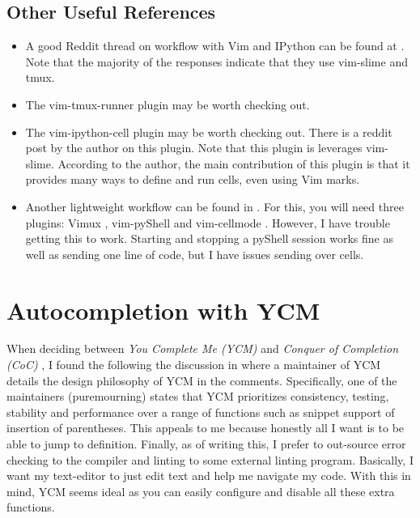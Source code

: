 \subsection{Other Useful References}
\begin{itemize}
    \item A good Reddit thread on workflow with Vim and IPython can be found at
        \cite{abdeljalil732020anyone}. Note that the majority of the responses
        indicate that they use vim-slime and tmux.
    \item The vim-tmux-runner plugin \cite{toomey2013tmuxrunner} may be worth checking out.
    \item The vim-ipython-cell plugin \cite{hanschen2019ipython} may be worth
        checking out. There is a reddit post \cite{hanschen2019reddit} by the
        author on this plugin. Note that this plugin is leverages vim-slime.
        According to the author, the main contribution of this plugin is that it
        provides many ways to define and run cells, even using Vim marks.
    \item Another lightweight workflow can be found in
        \cite{hornung2019boosting}. For this, you will need three plugins: Vimux
        \cite{benmills2009vimux}, vim-pyShell \cite{hornung2019pyShell} and
        vim-cellmode \cite{julienr2016vimcellmode}. However, I have trouble
        getting this to work. Starting and stopping a pyShell session works fine
        as well as sending one line of code, but I have issues sending over
        cells.
\end{itemize}

\section{Autocompletion with YCM}
When deciding between \emph{You Complete Me (YCM)} \cite{ycmcore2017ycm} and
\emph{Conquer of Completion (CoC)} \cite{neoclide2020conquer}, I found the
following the discussion in \cite{desmap2020ycmvscoc} where a maintainer of YCM
details the design philosophy of YCM in the comments. Specifically, one of the
maintainers (puremourning) states that YCM prioritizes consistency, testing,
stability and performance over a range of functions such as snippet support of
insertion of parentheses. This appeals to me because honestly all I want is to
be able to jump to definition. Finally, as of writing this, I prefer to
out-source error checking to the compiler and linting to some external linting
program. Basically, I want my text-editor to just edit text and help me navigate
my code. With this in mind, YCM seems ideal as you can easily configure and
disable all these extra functions.\\

